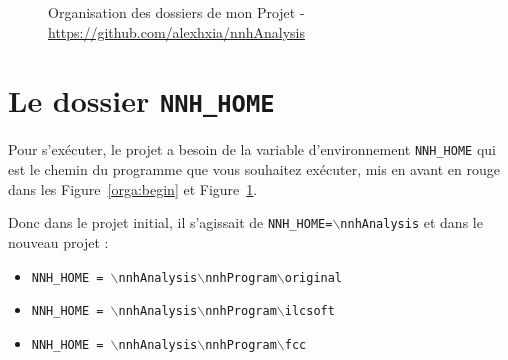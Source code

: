 \documentclass[10pt,a4paper]{report}
\begin{document}
\begin{appendix}
\begin{figure}[h!]
	\caption{
		Organisation des dossiers de mon Projet - \url{https://github.com/alexhxia/nnhAnalysis}
	}
	\label{orga:end}
\end{figure}

\section{Le dossier \texttt{NNH\_HOME}}

Pour s'exécuter, le projet a besoin de la variable d'environnement \texttt{NNH\_HOME} qui est le chemin du programme que vous souhaitez exécuter,  mis en avant en rouge dans les Figure~\ref{orga:begin} et Figure~\ref{orga:end}.

Donc dans le projet initial, il s'agissait de \texttt{NNH\_HOME=$\backslash$nnhAnalysis} et dans le nouveau projet :
\begin{itemize}
	\item \texttt{NNH\_HOME = $\backslash$nnhAnalysis$\backslash$nnhProgram$\backslash$original}
	\item \texttt{NNH\_HOME = $\backslash$nnhAnalysis$\backslash$nnhProgram$\backslash$ilcsoft}
	\item \texttt{NNH\_HOME = $\backslash$nnhAnalysis$\backslash$nnhProgram$\backslash$fcc}
\end{itemize}



\end{appendix}
\end{document}
